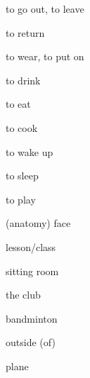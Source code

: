 \begin{flashcard}{\LARGE to go out, to leave}
\LARGE {}
\end{flashcard}
\begin{flashcard}{\LARGE to return}
\LARGE {}
\end{flashcard}
\begin{flashcard}{\LARGE to wear, to put on}
\LARGE {}
\end{flashcard}
\begin{flashcard}{\LARGE to drink}
\LARGE {}
\end{flashcard}
\begin{flashcard}{\LARGE to eat}
\LARGE {}
\end{flashcard}
\begin{flashcard}{\LARGE to cook}
\LARGE {}
\end{flashcard}
\begin{flashcard}{\LARGE to wake up}
\LARGE {}
\end{flashcard}
\begin{flashcard}{\LARGE to sleep}
\LARGE {}
\end{flashcard}
\begin{flashcard}{\LARGE to play}
\LARGE {}
\end{flashcard}
\begin{flashcard}{\LARGE (anatomy) face}
\LARGE {}
\end{flashcard}
\begin{flashcard}{\LARGE lesson/class}
\LARGE {}
\end{flashcard}
\begin{flashcard}{\LARGE sitting room}
\LARGE {}
\end{flashcard}
\begin{flashcard}{\LARGE the club}
\LARGE {}
\end{flashcard}
\begin{flashcard}{\LARGE bandminton}
\LARGE {}
\end{flashcard}
\begin{flashcard}{\LARGE outside (of)}
\LARGE {}
\end{flashcard}
\begin{flashcard}{\LARGE plane}
\LARGE {}
\end{flashcard}

